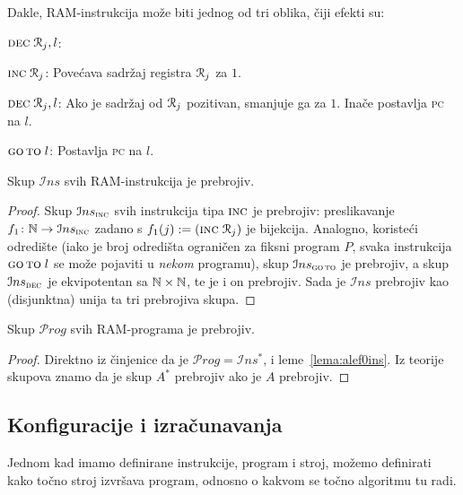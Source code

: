 Dakle, RAM-instrukcija može biti jednog od tri oblika, čiji efekti su:

\begin{labeling}{$\textsc{dec}\;\mathcal R_{j},l$:}
    \item[$\textsc{inc}\;\mathcal R_{j}$:] Povećava sadržaj registra $\mathcal R_{j}$ za $1$.
    \item[$\textsc{dec}\;\mathcal R_{j},l$:] Ako je sadržaj od $\mathcal R_{j}$ pozitivan, smanjuje ga za $1$. Inače postavlja \textsc{pc} na $l$.
    \item[$\textsc{go\,to}\;l$:] Postavlja \textsc{pc} na $l$.
\end{labeling}

\begin{lema}\label{lema:alef0ins}
Skup $\mathcal Ins$ svih RAM-instrukcija je prebrojiv.
\end{lema}
\begin{proof}
Skup $\mathcal Ins_{\textsc{inc}}$ svih instrukcija tipa $\textsc{inc}$ je prebrojiv: preslikavanje $f_1\colon{\mathbb N}\to\mathcal Ins_{\textsc{inc}}$ zadano s $f_1(j):=(\textsc{inc}\;\mathcal R_{j})$ je bijekcija. Analogno, koristeći odredište (iako je broj odredišta ograničen za fiksni program $P$, svaka instrukcija $\textsc{go\,to}\;l$ se može pojaviti u \emph{nekom} programu), skup $\mathcal Ins_{\textsc{go\,to}}$ je prebrojiv, a skup $\mathcal Ins_{\textsc{dec}}$ je ek\-vi\-po\-ten\-tan sa ${\mathbb N}\times{\mathbb N}$, te je i on prebrojiv. Sada je $\mathcal Ins$ prebrojiv kao (disjunktna) unija ta tri prebrojiva skupa.
\end{proof}

\begin{korolar}\label{kor:alef0prog}
Skup $\mathcal Prog$ svih RAM-programa je prebrojiv.
\end{korolar}
\begin{proof}
Direktno iz činjenice da je $\mathcal Prog=\mathcal Ins^*$, i leme~\ref{lema:alef0ins}. Iz teorije skupova znamo da je skup $A^*$ prebrojiv ako je $A$ prebrojiv.
\end{proof}

\subsection{Konfiguracije i izračunavanja}

Jednom kad imamo definirane instrukcije, program i stroj, možemo definirati kako točno stroj izvršava program, odnosno o kakvom se točno algoritmu tu radi.

